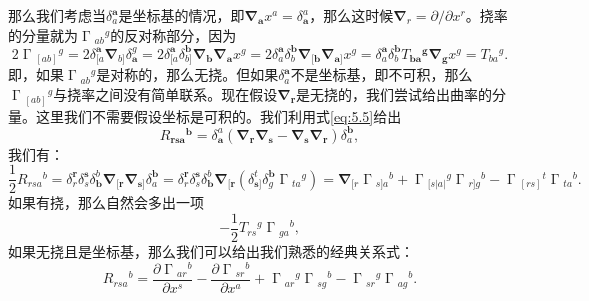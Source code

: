 那么我们考虑当$\delta _{a}^{\boldsymbol{a}}$是坐标基的情况，即$\boldsymbol{\nabla }_{\boldsymbol{a}} x^{a} =\delta _{\boldsymbol{a}}^{a}$，那么这时候$\boldsymbol{\nabla }_{r} =\partial /\partial x^{r}$。挠率的分量就为$\upGamma {_{ab}}^{g}$的反对称部分，因为
\begin{equation*}
	2\upGamma {_{[ ab]}}^{g} =2\delta _{[ a}^{\boldsymbol{a}}\boldsymbol{\nabla }_{b]} \delta _{\boldsymbol{a}}^{g} =2\delta _{[ a}^{\boldsymbol{a}} \delta _{b]}^{\boldsymbol{b}}\boldsymbol{\nabla }_{\boldsymbol{b}}\boldsymbol{\nabla }_{\boldsymbol{a}} x^{g} =2\delta _{a}^{\boldsymbol{a}} \delta _{b}^{\boldsymbol{b}}\boldsymbol{\nabla }_{[\boldsymbol{b}}\boldsymbol{\nabla }_{\boldsymbol{a}]} x^{g} =\delta _{a}^{\boldsymbol{a}} \delta _{b}^{\boldsymbol{b}} T{_{\boldsymbol{ba}}}^{\boldsymbol{g}}\boldsymbol{\nabla }_{\boldsymbol{g}} x^{g} =T{_{ba}}^{g} .
\end{equation*}
即，如果$\upGamma {_{ab}}^{g}$是对称的，那么无挠。但如果$\delta _{a}^{\boldsymbol{a}}$不是坐标基，即不可积，那么$\upGamma {_{[ ab]}}^{g}$与挠率之间没有简单联系。现在假设$\boldsymbol{\nabla }_{\boldsymbol{r}}$是无挠的，我们尝试给出曲率的分量。这里我们不需要假设坐标是可积的。我们利用式\ref{eq:5.5}给出
\begin{equation*}
	R{_{\boldsymbol{rsa}}}^{\boldsymbol{b}} =\delta _{\boldsymbol{a}}^{a} (\boldsymbol{\nabla }_{\boldsymbol{r}}\boldsymbol{\nabla }_{\boldsymbol{s}} -\boldsymbol{\nabla }_{\boldsymbol{s}}\boldsymbol{\nabla }_{\boldsymbol{r}} )\delta _{a}^{\boldsymbol{b}} ,
\end{equation*}
我们有：
\begin{equation*}
	\frac{1}{2} R{_{rsa}}^{b} =\delta _{r}^{\boldsymbol{r}} \delta _{s}^{\boldsymbol{s}} \delta _{\boldsymbol{b}}^{b}\boldsymbol{\nabla }_{[\boldsymbol{r}}\boldsymbol{\nabla }_{\boldsymbol{s}]} \delta _{a}^{\boldsymbol{b}} =\delta _{r}^{\boldsymbol{r}} \delta _{s}^{\boldsymbol{s}} \delta _{\boldsymbol{b}}^{b}\boldsymbol{\nabla }_{[\boldsymbol{r}} (\delta _{\boldsymbol{s}]}^{t} \delta _{g}^{\boldsymbol{b}} \upGamma {_{ta}}^{g} )=\boldsymbol{\nabla }_{[ r} \upGamma {_{s] a}}^{b} +\upGamma {_{[ s|a|}}^{g} \upGamma {_{r] g}}^{b} -\upGamma {_{[ rs]}}^{t} \upGamma {_{ta}}^{b} .
\end{equation*}
如果有挠，那么自然会多出一项
\begin{equation*}
	-\frac{1}{2} T{_{rs}}^{g} \upGamma {_{ga}}^{b} ,
\end{equation*}
如果无挠且是坐标基，那么我们可以给出我们熟悉的经典关系式：
\begin{equation*}
	R{_{rsa}}^{b} =\frac{\partial \upGamma {_{ar}}^{b}}{\partial x^{s}} -\frac{\partial \upGamma {_{sr}}^{b}}{\partial x^{a}} +\upGamma {_{ar}}^{g} \upGamma {_{sg}}^{b} -\upGamma {_{sr}}^{g} \upGamma {_{ag}}^{b} .
\end{equation*}
